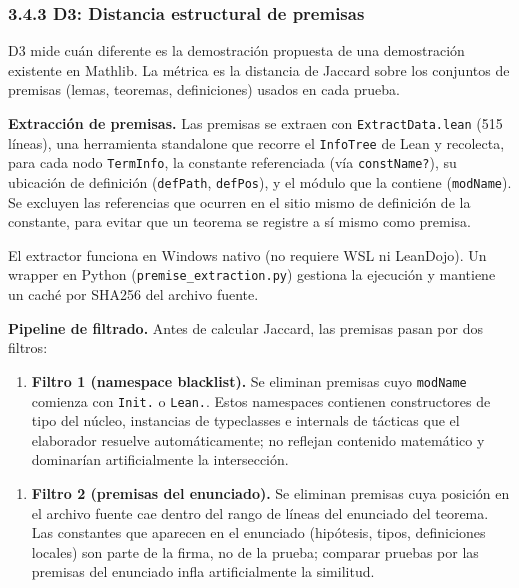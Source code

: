 \documentclass[12pt,a4paper]{article}
\theoremstyle{remark}
\begin{document}
\subsubsection{3.4.3 D3: Distancia estructural de premisas}

D3 mide cuán diferente es la demostración propuesta de una demostración existente en Mathlib. La métrica es la distancia de Jaccard sobre los conjuntos de premisas (lemas, teoremas, definiciones) usados en cada prueba.


\textbf{Extracción de premisas.} Las premisas se extraen con \texttt{ExtractData.lean} (515 líneas), una herramienta standalone que recorre el \texttt{InfoTree} de Lean y recolecta, para cada nodo \texttt{TermInfo}, la constante referenciada (vía \texttt{constName?}), su ubicación de definición (\texttt{defPath}, \texttt{defPos}), y el módulo que la contiene (\texttt{modName}). Se excluyen las referencias que ocurren en el sitio mismo de definición de la constante, para evitar que un teorema se registre a sí mismo como premisa.


El extractor funciona en Windows nativo (no requiere WSL ni LeanDojo). Un wrapper en Python (\texttt{premise\_extraction.py}) gestiona la ejecución y mantiene un caché por SHA256 del archivo fuente.


\textbf{Pipeline de filtrado.} Antes de calcular Jaccard, las premisas pasan por dos filtros:

\begin{enumerate}
\item \textbf{Filtro 1 (namespace blacklist).} Se eliminan premisas cuyo \texttt{modName} comienza con \texttt{Init.} o \texttt{Lean.}. Estos namespaces contienen constructores de tipo del núcleo, instancias de typeclasses e internals de tácticas que el elaborador resuelve automáticamente; no reflejan contenido matemático y dominarían artificialmente la intersección.
\end{enumerate}


\begin{enumerate}
\item \textbf{Filtro 2 (premisas del enunciado).} Se eliminan premisas cuya posición en el archivo fuente cae dentro del rango de líneas del enunciado del teorema. Las constantes que aparecen en el enunciado (hipótesis, tipos, definiciones locales) son parte de la firma, no de la prueba; comparar pruebas por las premisas del enunciado infla artificialmente la similitud.
\end{enumerate}
\end{document}

